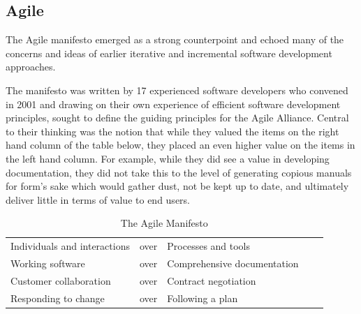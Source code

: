 \documentclass[a4paper,12pt]{article}
\begin{document}
\begin{samepage}
\subsection {Agile}
The Agile manifesto emerged as a strong counterpoint and echoed many of the concerns and ideas of earlier iterative and incremental software development approaches.

The manifesto was written by 17 experienced software developers who convened in 2001 and drawing on their own experience of efficient software development principles, sought to define the guiding principles for the Agile Alliance. Central to their thinking was the notion that while they valued the items on the right hand column of the table below, they placed an even higher value on the items in the left hand column. For example, while they did see a value in developing documentation, they did not take this to the level of generating copious manuals for form's sake which would gather dust, not be kept up to date, and ultimately deliver little in terms of value to end users.


\begin{table}[]
\centering
\caption{The Agile Manifesto}
\label{my-label}
\begin{tabular}{|l|l|l|ll}
\cline{1-3}
Individuals and interactions & over & Processes and tools          \\ \cline{1-3}
Working software             & over & Comprehensive documentation \\ \cline{1-3}
Customer collaboration       & over & Contract negotiation        \\ \cline{1-3}
Responding to change         & over & Following a plan              \\ \cline{1-3}
\end{tabular}
\end{table}



\end{samepage}
\end{document}
